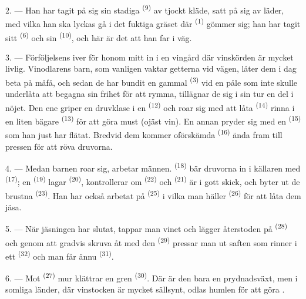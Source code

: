 2. --- Han har tagit på sig sin stadiga  \textsuperscript{(9)} av tjockt
kläde, satt på sig  av läder, med vilka han ska lyckas gå i det fuktiga
gräset där  \textsuperscript{(1)} gömmer sig; han har tagit sitt
 \textsuperscript{(6)} och sin  \textsuperscript{(10)}, och
här är det att han far i väg.

3. --- Förföljelsens iver för honom mitt in i en vingård där vinskörden är mycket livlig.
Vinodlarens barn, som vanligen vaktar getterna vid vägen, låter dem i dag beta på måfå, och
sedan de har bundit en gammal  \textsuperscript{(3)} vid en påle som inte skulle
underlåta att begagna sin frihet för att rymma, tillägnar de sig i sin tur en del i nöjet. Den
ene griper en druvklase i en  \textsuperscript{(12)} och roar sig med att
låta  \textsuperscript{(14)} rinna i en liten bägare \textsuperscript{(13)} för
att göra must (ojäst vin). En annan pryder sig med en
 \textsuperscript{(15)} som han just har flätat. Bredvid dem
kommer oförskämda  \textsuperscript{(16)} ända fram till pressen för att röva
druvorna.

4. --- Medan barnen roar sig, arbetar männen.  \textsuperscript{(18)} bär
druvorna in i källaren med  \textsuperscript{(17)}; en 
\textsuperscript{(19)} lagar
 \textsuperscript{(20)}, kontrollerar om 
\textsuperscript{(22)} och  \textsuperscript{(21)} är i gott skick, och
byter ut de brustna  \textsuperscript{(23)}. Han har också arbetat på
 \textsuperscript{(25)} i vilka man häller
 \textsuperscript{(26)} för att låta dem jäsa.

5. --- När jäsningen har slutat, tappar man vinet och lägger återstoden på
 \textsuperscript{(28)} och genom att gradvis skruva åt med den
 \textsuperscript{(29)} pressar man ut saften som rinner i
ett  \textsuperscript{(32)} och man får ännu 
\textsuperscript{(31)}.

\VUsaut{6.0mm}
\VUsaut{3.4mm}

6. --- Mot  \textsuperscript{(27)} mur klättrar en gren
 \textsuperscript{(30)}. Där är den bara en prydnadsväxt, men i
somliga länder, där vinstocken är mycket sällsynt, odlas humlen för att göra
.

